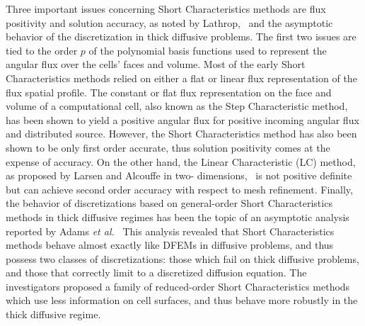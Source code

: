 Three important issues concerning Short Characteristics methods are flux positivity and solution accuracy, as noted by Lathrop,~\cite{Lathrop1969} and the asymptotic behavior of the discretization in thick diffusive problems.  The first two  issues are tied to the order $p$ of the polynomial basis functions used to represent the angular flux over the cells’ faces and volume.  Most of the early Short Characteristics methods relied on either a flat or linear flux representation of the flux spatial profile. The constant or flat flux representation on the face and volume of a computational cell, also known as the Step Characteristic method, has been shown to yield a positive angular flux for positive incoming angular flux and distributed source. However, the Short Characteristics method has also been shown to be only first order accurate, thus solution positivity comes at the expense of accuracy. On the other hand, the Linear Characteristic (LC) method, as proposed by Larsen and Alcouffe in two- dimensions,~\cite{Larsen1981} is not positive definite but can achieve second order accuracy with respect to mesh refinement. Finally, the behavior of discretizations based on general-order Short Characteristics methods in thick diffusive regimes has been the topic of an asymptotic analysis reported by Adams \textit{et al.}~\cite{Adams1998} This analysis revealed that Short Characteristics methods behave almost exactly like DFEMs in diffusive problems, and thus possess two classes of discretizations: those which fail on thick diffusive problems, and those that correctly limit to a discretized diffusion equation. The investigators proposed a family of reduced-order Short Characteristics methods which use less information on cell surfaces, and thus behave more robustly in the thick diffusive regime.

